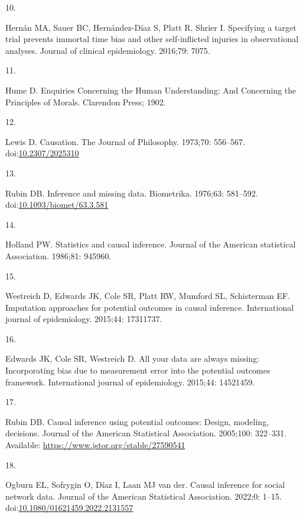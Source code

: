 \documentclass[
  singlecolumn]{article}
\newlength{\cslhangindent}
\newlength{\csllabelwidth}
\newlength{\cslentryspacingunit} %
\newenvironment{CSLReferences}[2] %
 {%
  \setlength{\parindent}{0pt}
  \ifodd #1
  \let\oldpar\par
  \def\par{\hangindent=\cslhangindent\oldpar}
  \fi
  \setlength{\parskip}{#2\cslentryspacingunit}
 }%
 {}
\newcommand{\CSLLeftMargin}[1]{\parbox[t]{\csllabelwidth}{#1}}
\newcommand{\CSLRightInline}[1]{\parbox[t]{\linewidth - \csllabelwidth}{#1}\break}
\begin{document}
\begin{CSLReferences}{0}{0}
\leavevmode{}%
\CSLLeftMargin{10. }%
\CSLRightInline{Hernán MA, Sauer BC, Hernández-Díaz S, Platt R, Shrier
I. Specifying a target trial prevents immortal time bias and other
self-inflicted injuries in observational analyses. Journal of clinical
epidemiology. 2016;79: 7075. }

\leavevmode{}%
\CSLLeftMargin{11. }%
\CSLRightInline{Hume D. Enquiries Concerning the Human Understanding:
And Concerning the Principles of Morals. Clarendon Press; 1902. }

\leavevmode{}%
\CSLLeftMargin{12. }%
\CSLRightInline{Lewis D. Causation. The Journal of Philosophy. 1973;70:
556--567. doi:\href{https://doi.org/10.2307/2025310}{10.2307/2025310}}

\leavevmode{}%
\CSLLeftMargin{13. }%
\CSLRightInline{Rubin DB. Inference and missing data. Biometrika.
1976;63: 581--592.
doi:\href{https://doi.org/10.1093/biomet/63.3.581}{10.1093/biomet/63.3.581}}

\leavevmode{}%
\CSLLeftMargin{14. }%
\CSLRightInline{Holland PW. Statistics and causal inference. Journal of
the American statistical Association. 1986;81: 945960. }

\leavevmode{}%
\CSLLeftMargin{15. }%
\CSLRightInline{Westreich D, Edwards JK, Cole SR, Platt RW, Mumford SL,
Schisterman EF. Imputation approaches for potential outcomes in causal
inference. International journal of epidemiology. 2015;44: 17311737. }

\leavevmode{}%
\CSLLeftMargin{16. }%
\CSLRightInline{Edwards JK, Cole SR, Westreich D. All your data are
always missing: Incorporating bias due to measurement error into the
potential outcomes framework. International journal of epidemiology.
2015;44: 14521459. }

\leavevmode{}%
\CSLLeftMargin{17. }%
\CSLRightInline{Rubin DB. Causal inference using potential outcomes:
Design, modeling, decisions. Journal of the American Statistical
Association. 2005;100: 322--331. Available:
\url{https://www.jstor.org/stable/27590541}}

\leavevmode{}%
\CSLLeftMargin{18. }%
\CSLRightInline{Ogburn EL, Sofrygin O, Díaz I, Laan MJ van der. Causal
inference for social network data. Journal of the American Statistical
Association. 2022;0: 1--15.
doi:\href{https://doi.org/10.1080/01621459.2022.2131557}{10.1080/01621459.2022.2131557}}


\end{CSLReferences}
\end{document}
